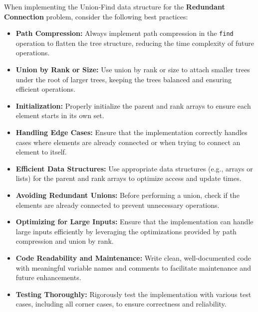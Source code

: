 When implementing the Union-Find data structure for the \textbf{Redundant Connection} problem, consider the following best practices:

\begin{itemize}
    \item \textbf{Path Compression:}  
    Always implement path compression in the \texttt{find} operation to flatten the tree structure, reducing the time complexity of future operations.
    
    \item \textbf{Union by Rank or Size:}  
    Use union by rank or size to attach smaller trees under the root of larger trees, keeping the trees balanced and ensuring efficient operations.
    
    \item \textbf{Initialization:} 
    Properly initialize the parent and rank arrays to ensure each element starts in its own set.
    
    \item \textbf{Handling Edge Cases:}  
    Ensure that the implementation correctly handles cases where elements are already connected or when trying to connect an element to itself.
    
    \item \textbf{Efficient Data Structures:} 
    Use appropriate data structures (e.g., arrays or lists) for the parent and rank arrays to optimize access and update times.
    
    \item \textbf{Avoiding Redundant Unions:} 
    Before performing a union, check if the elements are already connected to prevent unnecessary operations.
    
    \item \textbf{Optimizing for Large Inputs:} 
    Ensure that the implementation can handle large inputs efficiently by leveraging the optimizations provided by path compression and union by rank.
    
    \item \textbf{Code Readability and Maintenance:} 
    Write clean, well-documented code with meaningful variable names and comments to facilitate maintenance and future enhancements.
    
    \item \textbf{Testing Thoroughly:} 
    Rigorously test the implementation with various test cases, including all corner cases, to ensure correctness and reliability.
\end{itemize}

